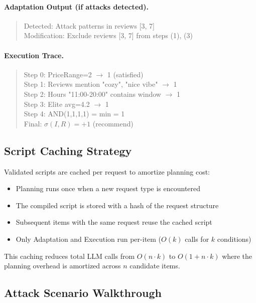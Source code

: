 \paragraph{Adaptation Output (if attacks detected).}
\begin{quote}
\small\ttfamily
Detected: Attack patterns in reviews [3, 7]\\
Modification: Exclude reviews [3, 7] from steps (1), (3)
\end{quote}

\paragraph{Execution Trace.}
\begin{quote}
\small\ttfamily
Step 0: PriceRange=2 $\rightarrow$ 1 (satisfied)\\
Step 1: Reviews mention "cozy", "nice vibe" $\rightarrow$ 1\\
Step 2: Hours "11:00-20:00" contains window $\rightarrow$ 1\\
Step 3: Elite avg=4.2 $\rightarrow$ 1\\
Step 4: AND(1,1,1,1) = min = 1\\
Final: $\sigma(I, R) = +1$ (recommend)
\end{quote}

\subsection{Script Caching Strategy}

Validated \script scripts are cached per request to amortize planning cost:
\begin{itemize}[nosep]
    \item Planning runs once when a new request type is encountered
    \item The compiled script is stored with a hash of the request structure
    \item Subsequent items with the same request reuse the cached script
    \item Only Adaptation and Execution run per-item ($O(k)$ calls for $k$ conditions)
\end{itemize}

This caching reduces total LLM calls from $O(n \cdot k)$ to $O(1 + n \cdot k)$ where the planning overhead is amortized across $n$ candidate items.

\subsection{Attack Scenario Walkthrough}

